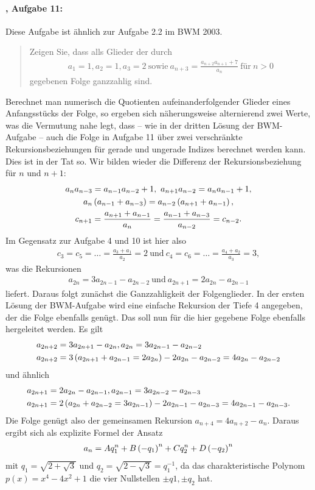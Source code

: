 \documentclass[11pt,a4paper]{article}
\begin{document}
\paragraph{\cite{S}, Aufgabe 11:}
Diese Aufgabe ist ähnlich zur Aufgabe 2.2 im BWM 2003. 
\begin{quote}
  Zeigen Sie, dass alls Glieder der durch 
  \begin{gather*}
    a_1=1, a_2=1, a_3=2\ \text{sowie}\ a_{n+3}=\frac{a_{n+2}a_{n+1}+7}{a_n}\
    \text{für}\ n>0 
  \end{gather*}
  gegebenen Folge ganzzahlig sind.  
\end{quote}
Berechnet man numerisch die Quotienten aufeinanderfolgender Glieder eines
Anfangsstücks der Folge, so ergeben sich näherungsweise alternierend zwei
Werte, was die Vermutung nahe legt, dass -- wie in der dritten Lösung der
BWM-Aufgabe -- auch die Folge in Aufgabe 11 über zwei verschränkte
Rekursionsbeziehungen für gerade und ungerade Indizes berechnet werden kann.
Dies ist in der Tat so. Wir bilden wieder die Differenz der
Rekursionsbeziehung für $n$ und $n+1$:
\begin{gather*}
  a_na_{n-3}=a_{n-1}a_{n-2}+1,\ a_{n+1}a_{n-2}=a_na_{n-1}+1,\\
  a_n\left(a_{n-1}+a_{n-3}\right)=a_{n-2}\left(a_{n+1}+a_{n-1}\right),\\
  c_{n+1}=\frac{a_{n+1}+a_{n-1}}{a_n}=\frac{a_{n-1}+a_{n-3}}{a_{n-2}}=c_{n-2}.
\end{gather*}
Im Gegensatz zur Aufgabe 4 und 10 ist hier also
\begin{gather*}
  c_3=c_5=\dots=\frac{a_3+a_1}{a_2}=2\ \text{und}\
  c_4=c_6=\dots=\frac{a_4+a_2}{a_3}=3, 
\end{gather*}
was die Rekursionen
\begin{gather*}
  a_{2n}=3a_{2n-1}-a_{2n-2}\ \text{und}\ a_{2n+1}=2a_{2n}-a_{2n-1}
\end{gather*}
liefert.  Daraus folgt zunächst die Ganzzahligkeit der Folgenglieder.  In der
ersten Lösung der BWM-Aufgabe wird eine einfache Rekursion der Tiefe 4
angegeben, der die Folge ebenfalls genügt.  Das soll nun für die hier gegebene
Folge ebenfalls hergeleitet werden.  Es gilt
\begin{align*}
  a_{2n+2}&=3a_{2n+1}-a_{2n}, a_{2n}=3a_{2n-1}-a_{2n-2}\\
  a_{2n+2}&=3\left(a_{2n+1}+a_{2n-1}=2a_{2n}\right)-2a_{2n}-a_{2n-2}=4a_{2n}-a_{2n-2} 
\end{align*}
und ähnlich
\begin{align*}
  a_{2n+1}&=2a_{2n}-a_{2n-1}, a_{2n-1}=3a_{2n-2}-a_{2n-3}\\
  a_{2n+1}&=2\left(a_{2n}+a_{2n-2}=3a_{2n-1}\right)-2a_{2n-1}-a_{2n-3}=4a_{2n-1}-a_{2n-3}.
\end{align*}
Die Folge genügt also der gemeinsamen Rekursion $a_{n+4}=4a_{n+2}-a_n$.
Daraus ergibt sich als explizite Formel der Ansatz 
\begin{gather*}
  a_n=Aq_1^n+B\left(-q_1\right)^n+Cq_2^n+D\left(-q_2\right)^n
\end{gather*}
mit $q_1=\sqrt{2+\sqrt{3}}$ und $q_2=\sqrt{2-\sqrt{3}}=q_1^{-1}$, da das
charakteristische Polynom $p(x)=x^4-4x^2+1$ die vier Nullstellen $\pm q1, \pm
q_2$ hat. 
\end{document}
